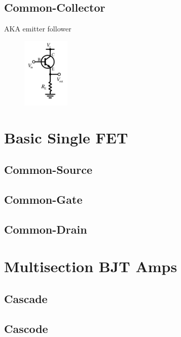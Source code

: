 \documentclass{report}
\newcommand{\imwidth}{0.2\textwidth}
\begin{document}
\section{Common-Collector}
AKA emitter follower
\begin{figure}
\centering
\includegraphics[width = \imwidth]{NPN_common_collector}
\caption{}
\end{figure}


\chapter{Basic Single FET}
\cite{feucht2010designing}
\cite{artOfElectronics}
\section{Common-Source}
\section{Common-Gate}
\section{Common-Drain}

\chapter{Multisection BJT Amps}
\section{Cascade}
\section{Cascode}
\end{document}
